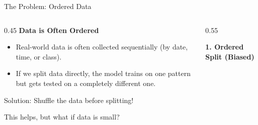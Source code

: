\begin{frame}{The Problem: Ordered Data}
    
    \begin{columns}[c]
        \begin{column}{0.45\textwidth}
            \textbf{Data is Often Ordered}
            \begin{itemize}
                \item Real-world data is often collected sequentially (by date, time, or class).
                \item If we split data directly, the model trains on one pattern but gets tested on a completely different one.
            \end{itemize}
            
            \vspace{1em}
            \begin{block}{Solution: }Shuffle the data before splitting!
            \end{block}
            \vspace{1em}
            \begin{block}{This helps, but what if data is small?}
            \end{block}
        \end{column}
        
        \begin{column}{0.55\textwidth}
            \centering
            
            \textbf{1. Ordered Split (Biased)}
            \vspace{0.2em}
\end{column}
\end{columns}
\end{frame}
